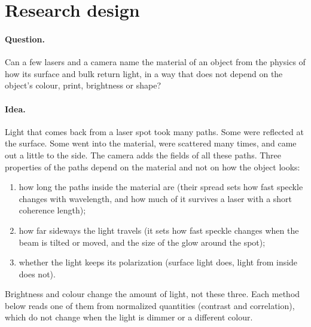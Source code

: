 \documentclass[11pt]{article}
\begin{document}
\section{Research design}\label{sec:design}

\paragraph{Question.} Can a few lasers and a camera name the material of an object from the physics of how its
surface and bulk return light, in a way that does not depend on the object's colour, print, brightness or shape?

\paragraph{Idea.} Light that comes back from a laser spot took many paths. Some were reflected at the surface. Some
went into the material, were scattered many times, and came out a little to the side. The camera adds the fields of
all these paths. Three properties of the paths depend on the material and not on how the object looks:
\begin{enumerate}
\item how long the paths inside the material are (their spread sets how fast speckle changes with wavelength, and how
  much of it survives a laser with a short coherence length);
\item how far sideways the light travels (it sets how fast speckle changes when the beam is tilted or moved, and the
  size of the glow around the spot);
\item whether the light keeps its polarization (surface light does, light from inside does not).
\end{enumerate}
Brightness and colour change the amount of light, not these three. Each method below reads one of them from
normalized quantities (contrast and correlation), which do not change when the light is dimmer or a different colour.
\end{document}

